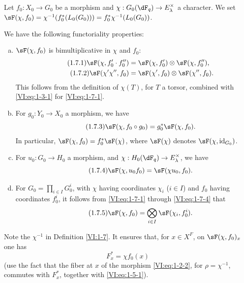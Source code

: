 \begin{definition_}\label{VI:1-7}
Let $f_0:X_0\to G_0$ be a morphism and 
$\chi:G_0(\dF_q)\to E_\lambda^\times$ a character. We set 
$\sF(\chi,f_0) = \chi^{-1}(f_0^\ast (L_0(G_0))) = f_0^\ast\chi^{-1}(L_0(G_0))$. 
\end{definition_}

We have the following functoriality properties:
\begin{enumerate}[a)]
  \item $\sF(\chi,f_0)$ is bimultiplicative in $\chi$ and $f_0$: 
    \begin{align*}\tag{1.7.1}\label{VI:eq:1-7-1}
      \sF(\chi,f_0'\cdot f_0'') &= \sF(\chi,f_0')\otimes \sF(\chi,f_0'') \text{,} \\
      \tag{1.7.2}\label{VI:eq:1-7-2}
      \sF(\chi'\chi'',f_0) &= \sF(\chi',f_0)\otimes \sF(\chi'',f_0) \text{.}
    \end{align*}
    This follows from the definition of $\chi(T)$, for $T$ a torsor, combined 
    with \eqref{VI:eq:1-3-1} for \eqref{VI:eq:1-7-1}. 
  \item For $g_0:Y_0\to X_0$ a morphism, we have 
    \begin{equation*}\tag{1.7.3}\label{VI:eq:1-7-3}
      \sF(\chi,f_0\circ g_0) = g_0^\ast \sF(\chi,f_0) \text{.}
    \end{equation*}
    In particular, $\sF(\chi,f_0) = f_0^\ast \sF(\chi)$, where $\sF(\chi)$ 
    denotes $\sF(\chi,\operatorname{id}_{G_0})$. 
  \item For $u_0:G_0\to H_0$ a morphism, and 
    $\chi:H_0(\dF_q) \to E_\lambda^\times$, we have 
    \begin{equation*}\tag{1.7.4}\label{VI:eq:1-7-4}
      \sF(\chi,u_0 f_0) = \sF(\chi u_0,f_0) \text{.}
    \end{equation*}
  \item For $G_0=\prod_{i\in I} G_0^i$, with $\chi$ having coordinates $\chi_i$ 
    ($i\in I$) and $f_0$ having coordinates $f_0^i$, it follows from 
    \eqref{VI:eq:1-7-1} through \eqref{VI:eq:1-7-4} that 
    \begin{equation*}\tag{1.7.5}\label{VI:eq:1-7-5}
      \sF(\chi,f_0) = \bigotimes_{i\in I} \sF(\chi_i,f_0^i) \text{.}
    \end{equation*}    
\end{enumerate}

Note the $\chi^{-1}$ in Definition \ref{VI:1-7}. It ensures that, for 
$x\in X^F$, on $\sF(\chi,f_0)_x$ one has 
\begin{equation*}\tag{1.7.6}\label{VI:eq:1-7-6}
  F_x^\ast = \chi f_0(x)
\end{equation*}
(use the fact that the fiber at $x$ of the morphism \eqref{VI:eq:1-2-2}, for 
$\rho=\chi^{-1}$, commutes with $F_x^\ast$, together with \eqref{VI:eq:1-5-1}). 

